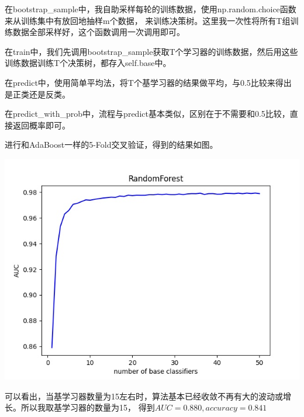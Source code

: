 \documentclass{article}
\begin{document}
        在bootstrap\_sample中，我自助采样每轮的训练数据，使用np.random.choice函数来从训练集中有放回地抽样m个数据，
        来训练决策树。这里我一次性将所有T组训练数据全部采样好，这个函数调用一次调用即可。

        在train中，我们先调用bootstrap\_sample获取T个学习器的训练数据，然后用这些训练数据训练T个决策树，都存入self.base中。

        在predict中，使用简单平均法，将T个基学习器的结果做平均，与0.5比较来得出是正类还是反类。

        在predict\_with\_prob中，流程与predict基本类似，区别在于不需要和0.5比较，直接返回概率即可。

        进行和AdaBoost一样的5-Fold交叉验证，得到的结果如图。

        {\centering
        \includegraphics[scale=0.6]{RandomForest.jpg}}

        可以看出，当基学习器数量为15左右时，算法基本已经收敛不再有大的波动或增长。所以我取基学习器的数量为15，
        得到$AUC=0.880, accuracy=0.841$
\end{document}
